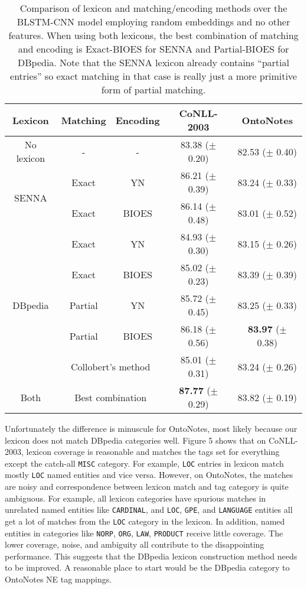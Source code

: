 \documentclass[11pt,letterpaper]{article}
\begin{document}
\begin{table*}[t]
\begin{center}
\small
\begin{tabular}{|c|c|c|c|c|}
\hline \bf Lexicon & \bf Matching & \bf Encoding & \bf CoNLL-2003 & \bf OntoNotes \\ \hline
No lexicon & - & - & 83.38 ($\pm$ 0.20) & 82.53 ($\pm$ 0.40) \\ \hline
\multirow{2}{*}{SENNA}
 & Exact   & YN    & 86.21 ($\pm$ 0.39) & 83.24 ($\pm$ 0.33) \\ 
 & Exact   & BIOES & 86.14 ($\pm$ 0.48) & 83.01 ($\pm$ 0.52) \\ \hline
\multirow{5}{*}{DBpedia}
 & Exact   & YN    & 84.93 ($\pm$ 0.30) & 83.15 ($\pm$ 0.26) \\
 & Exact   & BIOES & 85.02 ($\pm$ 0.23) & 83.39 ($\pm$ 0.39) \\
 & Partial & YN    & 85.72 ($\pm$ 0.45) & 83.25 ($\pm$ 0.33) \\
 & Partial & BIOES & 86.18 ($\pm$ 0.56) & {\bf 83.97} ($\pm$ 0.38) \\ \cline{2-5}
 & \multicolumn{2}{|c|}{Collobert's method} & 85.01 ($\pm$ 0.31) & 83.24 ($\pm$ 0.26) \\ \hline
Both & \multicolumn{2}{|c|}{Best combination} & {\bf 87.77} ($\pm$ 0.29) & 83.82 ($\pm$ 0.19) \\
\hline
\end{tabular}
\end{center}
\caption{Comparison of lexicon and matching/encoding methods over the BLSTM-CNN model employing random embeddings and no other features. When using both lexicons, the best combination of matching and encoding is Exact-BIOES for SENNA and Partial-BIOES for DBpedia. Note that the SENNA lexicon already contains ``partial entries'' so exact matching in that case is really just a more primitive form of partial matching.}
\label{tab:lexicon-res}
\end{table*}

Unfortunately the difference is minuscule for OntoNotes, most likely because our lexicon does not match DBpedia categories well. Figure 5 shows that on CoNLL-2003, lexicon coverage is reasonable and matches the tags set for everything except the catch-all \texttt{MISC} category. For example, \texttt{LOC} entries in lexicon match mostly \texttt{LOC} named entities and vice versa. However, on OntoNotes, the matches are noisy and correspondence between lexicon match and tag category is quite ambiguous. For example, all lexicon categories have spurious matches in unrelated named entities like \texttt{CARDINAL}, and \texttt{LOC}, \texttt{GPE}, and \texttt{LANGUAGE} entities all get a lot of matches from the \texttt{LOC} category in the lexicon. In addition, named entities in categories like \texttt{NORP}, \texttt{ORG}, \texttt{LAW}, \texttt{PRODUCT} receive little coverage. The lower coverage, noise, and ambiguity all contribute to the disappointing performance. This suggests that the DBpedia lexicon construction method needs to be improved. A reasonable place to start would be the DBpedia category to OntoNotes NE tag mappings.
\end{document}
